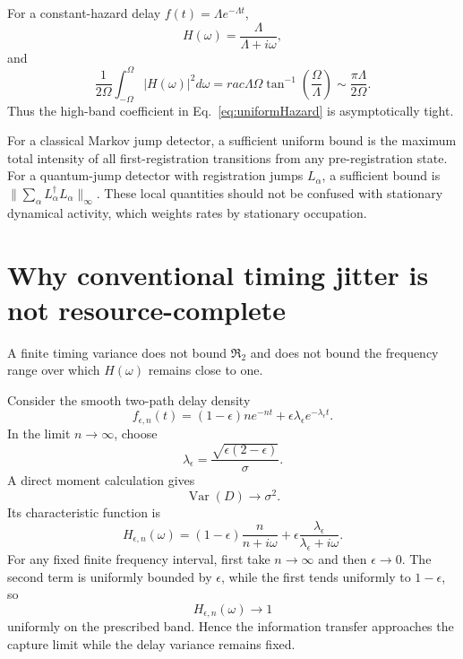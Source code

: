\documentclass[aps,prapplied,preprint,nofootinbib]{revtex4-2}
\newcommand{\Rtwo}{\mathfrak R_2}
\begin{document}
For a constant-hazard delay $f(t)=\Lambda e^{-\Lambda t}$,
\begin{equation}
H(\omega)=\frac{\Lambda}{\Lambda+i\omega},
\end{equation}
and
\begin{equation}
\frac{1}{2\Omega}\int_{-\Omega}^{\Omega}|H(\omega)|^2d\omega
=rac{\Lambda}{\Omega}\tan^{-1}\left(\frac{\Omega}{\Lambda}\right)
\sim\frac{\pi\Lambda}{2\Omega}.
\end{equation}
Thus the high-band coefficient in Eq.~\eqref{eq:uniformHazard} is asymptotically tight.

For a classical Markov jump detector, a sufficient uniform bound is the maximum total intensity of all first-registration transitions from any pre-registration state.  For a quantum-jump detector with registration jumps $L_\alpha$, a sufficient bound is $\|\sum_\alpha L_\alpha^\dagger L_\alpha\|_\infty$.  These local quantities should not be confused with stationary dynamical activity, which weights rates by stationary occupation.

\section{Why conventional timing jitter is not resource-complete}
\label{sec:jitterNoGo}

A finite timing variance does not bound $\Rtwo$ and does not bound the frequency range over which $H(\omega)$ remains close to one.

Consider the smooth two-path delay density
\begin{equation}
f_{\epsilon,n}(t)
=(1-\epsilon)n e^{-nt}
+\epsilon\lambda_\epsilon e^{-\lambda_\epsilon t}.
\label{eq:mixture}
\end{equation}
In the limit $n\to\infty$, choose
\begin{equation}
\lambda_\epsilon
=\frac{\sqrt{\epsilon(2-\epsilon)}}{\sigma}.
\label{eq:lambdaeps}
\end{equation}
A direct moment calculation gives
\begin{equation}
\operatorname{Var}(D)\to\sigma^2.
\end{equation}
Its characteristic function is
\begin{equation}
H_{\epsilon,n}(\omega)
=(1-\epsilon)\frac{n}{n+i\omega}
+\epsilon\frac{\lambda_\epsilon}{\lambda_\epsilon+i\omega}.
\label{eq:Hmix}
\end{equation}
For any fixed finite frequency interval, first take $n\to\infty$ and then $\epsilon\to0$.  The second term is uniformly bounded by $\epsilon$, while the first tends uniformly to $1-\epsilon$, so
\begin{equation}
H_{\epsilon,n}(\omega)\to1
\end{equation}
uniformly on the prescribed band.  Hence the information transfer approaches the capture limit while the delay variance remains fixed.
\end{document}
